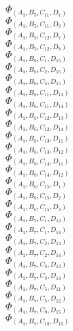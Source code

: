 \documentclass[14pt]{article}
\begin{document}
    $\Phi_{({A}_{1}, {B}_{5}, {C}_{11}, {D}_{7})}$ \\ 
    $\Phi_{({A}_{1}, {B}_{5}, {C}_{11}, {D}_{8})}$ \\ 
    $\Phi_{({A}_{1}, {B}_{5}, {C}_{12}, {D}_{7})}$ \\ 
    $\Phi_{({A}_{1}, {B}_{5}, {C}_{12}, {D}_{8})}$ \\ 
    $\Phi_{({A}_{1}, {B}_{6}, {C}_{1}, {D}_{15})}$ \\ 
    $\Phi_{({A}_{1}, {B}_{6}, {C}_{2}, {D}_{15})}$ \\ 
    $\Phi_{({A}_{1}, {B}_{6}, {C}_{3}, {D}_{15})}$ \\ 
    $\Phi_{({A}_{1}, {B}_{6}, {C}_{11}, {D}_{13})}$ \\ 
    $\Phi_{({A}_{1}, {B}_{6}, {C}_{11}, {D}_{14})}$ \\ 
    $\Phi_{({A}_{1}, {B}_{6}, {C}_{12}, {D}_{13})}$ \\ 
    $\Phi_{({A}_{1}, {B}_{6}, {C}_{12}, {D}_{14})}$ \\ 
    $\Phi_{({A}_{1}, {B}_{6}, {C}_{13}, {D}_{11})}$ \\ 
    $\Phi_{({A}_{1}, {B}_{6}, {C}_{13}, {D}_{12})}$ \\ 
    $\Phi_{({A}_{1}, {B}_{6}, {C}_{14}, {D}_{11})}$ \\ 
    $\Phi_{({A}_{1}, {B}_{6}, {C}_{14}, {D}_{12})}$ \\ 
    $\Phi_{({A}_{1}, {B}_{6}, {C}_{15}, {D}_{1})}$ \\ 
    $\Phi_{({A}_{1}, {B}_{6}, {C}_{15}, {D}_{2})}$ \\ 
    $\Phi_{({A}_{1}, {B}_{6}, {C}_{15}, {D}_{3})}$ \\ 
    $\Phi_{({A}_{1}, {B}_{7}, {C}_{1}, {D}_{13})}$ \\ 
    $\Phi_{({A}_{1}, {B}_{7}, {C}_{1}, {D}_{14})}$ \\ 
    $\Phi_{({A}_{1}, {B}_{7}, {C}_{2}, {D}_{13})}$ \\ 
    $\Phi_{({A}_{1}, {B}_{7}, {C}_{2}, {D}_{14})}$ \\ 
    $\Phi_{({A}_{1}, {B}_{7}, {C}_{3}, {D}_{13})}$ \\ 
    $\Phi_{({A}_{1}, {B}_{7}, {C}_{3}, {D}_{14})}$ \\ 
    $\Phi_{({A}_{1}, {B}_{7}, {C}_{5}, {D}_{11})}$ \\ 
    $\Phi_{({A}_{1}, {B}_{7}, {C}_{5}, {D}_{12})}$ \\ 
    $\Phi_{({A}_{1}, {B}_{7}, {C}_{9}, {D}_{15})}$ \\ 
    $\Phi_{({A}_{1}, {B}_{7}, {C}_{10}, {D}_{15})}$ \\ 
\end{document}
